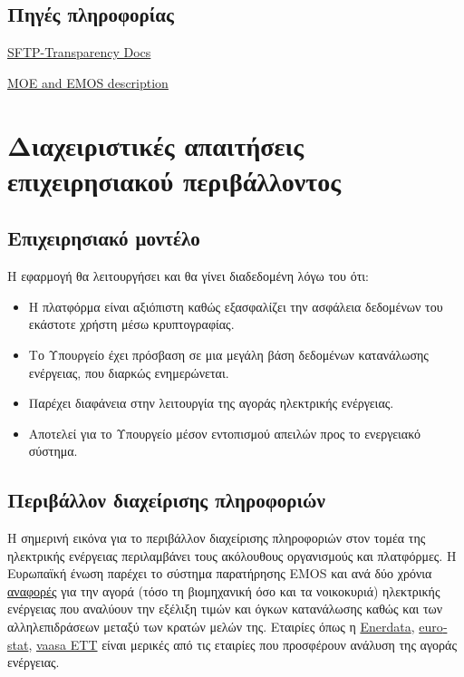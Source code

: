 \documentclass[a4paper,12pt, oneside]{article}
\begin{document}
\subsection*{Πηγές πληροφορίας}
\begingroup
\latintext
\sloppy
\begin{enumerate}
\begin{sloppypar}
   \item \href{https://transparency.entsoe.eu/content/static\_content/Static\%20content/knowledge\%20base/SFTP-Transparency\_Docs.html}{SFTP-Transparency Docs}
   \item \href{https://ec.europa.eu/energy/sites/ener/files/documents/moe_and_emos_description.pdf}{MOE and EMOS description}
   \end{sloppypar}
\end{enumerate}
\endgroup
\greektext


\section{Διαχειριστικές απαιτήσεις επιχειρησιακού περιβάλλοντος} 
\subsection{Επιχειρησιακό μοντέλο}
Η εφαρμογή θα λειτουργήσει και θα γίνει διαδεδομένη λόγω του ότι:
\begin{itemize}
  \item Η πλατφόρμα είναι αξιόπιστη καθώς εξασφαλίζει την ασφάλεια δεδομένων του εκάστοτε χρήστη μέσω κρυπτογραφίας.
  \item Το Υπουργείο έχει πρόσβαση σε μια μεγάλη βάση δεδομένων κατανάλωσης ενέργειας, που διαρκώς ενημερώνεται.
  \item Παρέχει διαφάνεια στην λειτουργία της αγοράς ηλεκτρικής ενέργειας.
    \item Αποτελεί για το Υπουργείο μέσον εντοπισμού απειλών προς το ενεργειακό σύστημα.
\end{itemize}


\subsection{Περιβάλλον διαχείρισης πληροφοριών}
Η σημερινή εικόνα για το περιβάλλον διαχείρισης πληροφοριών  στον τομέα της ηλεκτρικής ενέργειας περιλαμβάνει τους ακόλουθους οργανισμούς και πλατφόρμες. Η Ευρωπαϊκή ένωση παρέχει το σύστημα παρατήρησης \textlatin{EMOS} και ανά δύο χρόνια \href{https://ec.europa.eu/energy/en/data-analysis/market-analysis#gas-and-electricity-market-reports}{αναφορές} για την αγορά (τόσο τη βιομηχανική όσο και τα νοικοκυριά) ηλεκτρικής ενέργειας  που αναλύουν την εξέλιξη τιμών και όγκων κατανάλωσης καθώς και των αλληλεπιδράσεων μεταξύ των κρατών μελών της. Εταιρίες όπως η \href{https://www.enerdata.net}{\textlatin{Enerdata}}, \href{https://ec.europa.eu/eurostat/web/energy}{\textlatin{eurostat}}, \href{http://www.vaasaett.com}{\textlatin{vaasa ETT}} είναι μερικές από τις εταιρίες που προσφέρουν ανάλυση της αγοράς ενέργειας. 
\newpage
\end{document}
